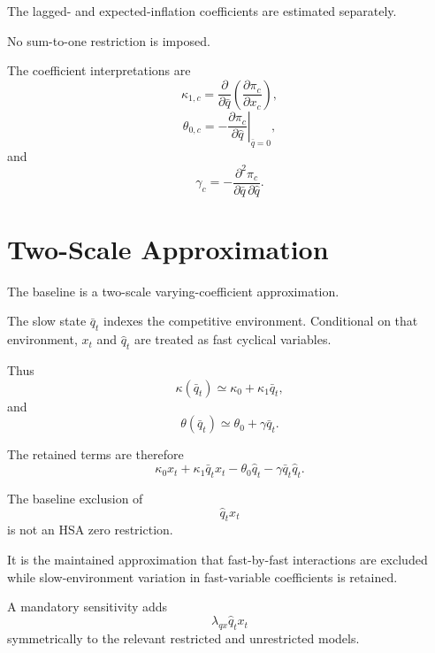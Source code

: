 \documentclass[11pt]{article}
\begin{document}
The lagged- and expected-inflation coefficients are estimated separately.

No sum-to-one restriction is imposed.

The coefficient interpretations are
\begin{equation}
\kappa_{1,c}
=
\frac{\partial}{\partial\bar q}
\left(
\frac{\partial\pi_c}{\partial x_c}
\right),
\end{equation}
\begin{equation}
\theta_{0,c}
=
-
\left.
\frac{\partial\pi_c}{\partial\hat q}
\right|_{\bar q=0},
\end{equation}
and
\begin{equation}
\gamma_c
=
-
\frac{\partial^2\pi_c}
{\partial\bar q\,\partial\hat q}.
\end{equation}

\section{Two-Scale Approximation}

The baseline is a two-scale varying-coefficient approximation.

The slow state \(\bar q_t\) indexes the competitive environment. Conditional on that environment, \(x_t\) and \(\hat q_t\) are treated as fast cyclical variables.

Thus
\begin{equation}
\kappa(\bar q_t)
\simeq
\kappa_0+\kappa_1\bar q_t,
\end{equation}
and
\begin{equation}
\theta(\bar q_t)
\simeq
\theta_0+\gamma\bar q_t.
\end{equation}

The retained terms are therefore
\begin{equation}
\kappa_0x_t
+\kappa_1\bar q_tx_t
-\theta_0\hat q_t
-\gamma\bar q_t\hat q_t.
\end{equation}

The baseline exclusion of
\begin{equation}
\hat q_tx_t
\end{equation}
is not an HSA zero restriction.

It is the maintained approximation that fast-by-fast interactions are excluded while slow-environment variation in fast-variable coefficients is retained.

A mandatory sensitivity adds
\begin{equation}
\lambda_{qx}\hat q_tx_t
\end{equation}
symmetrically to the relevant restricted and unrestricted models.
\end{document}
